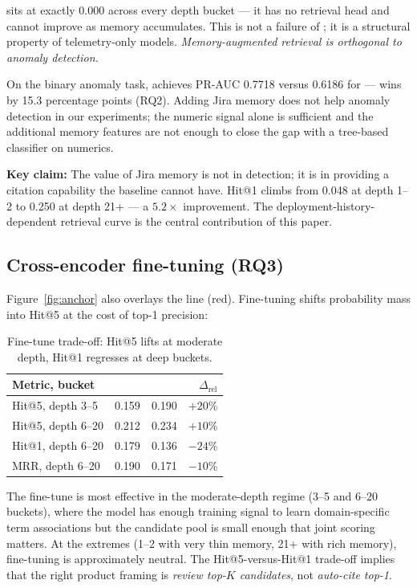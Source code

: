 \hgb{} sits at exactly 0.000 across every depth bucket --- it has no retrieval head and cannot improve as memory accumulates. This is not a failure of \hgb{}; it is a structural property of telemetry-only models. \emph{Memory-augmented retrieval is orthogonal to anomaly detection.}

On the binary anomaly task, \hgb{} achieves PR-AUC 0.7718 versus 0.6186 for \sota{} --- \hgb{} wins by 15.3 percentage points (RQ2). Adding Jira memory does not help anomaly detection in our experiments; the numeric signal alone is sufficient and the additional memory features are not enough to close the gap with a tree-based classifier on numerics.

\textbf{Key claim:} The value of Jira memory is not in detection; it is in providing a citation capability the baseline cannot have. Hit@1 climbs from 0.048 at depth 1--2 to 0.250 at depth 21+ --- a $5.2\times$ improvement. The deployment-history-dependent retrieval curve is the central contribution of this paper.

\subsection{Cross-encoder fine-tuning (RQ3)}

Figure~\ref{fig:anchor} also overlays the \sotaft{} line (red). Fine-tuning shifts probability mass into Hit@5 at the cost of top-1 precision:

\begin{table}[h]
\centering
\small
\caption{Fine-tune trade-off: Hit@5 lifts at moderate depth, Hit@1 regresses at deep buckets.}
\label{tab:ft}
\begin{tabular}{lrrr}
\toprule
Metric, bucket & \sota{} & \sotaft{} & $\Delta_{\text{rel}}$ \\
\midrule
Hit@5, depth 3--5  & 0.159 & 0.190 & $+20\%$ \\
Hit@5, depth 6--20 & 0.212 & 0.234 & $+10\%$ \\
Hit@1, depth 6--20 & 0.179 & 0.136 & $-24\%$ \\
MRR,   depth 6--20 & 0.190 & 0.171 & $-10\%$ \\
\bottomrule
\end{tabular}
\end{table}

The fine-tune is most effective in the moderate-depth regime (3--5 and 6--20 buckets), where the model has enough training signal to learn domain-specific term associations but the candidate pool is small enough that joint scoring matters. At the extremes (1--2 with very thin memory, 21+ with rich memory), fine-tuning is approximately neutral. The Hit@5-versus-Hit@1 trade-off implies that the right product framing is \emph{review top-$K$ candidates}, not \emph{auto-cite top-1}.

